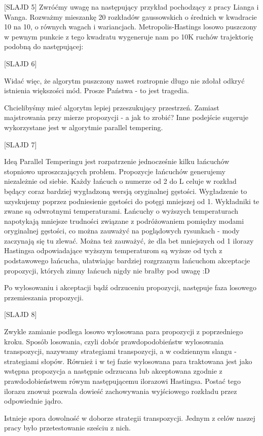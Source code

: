 [SLAJD 5] 
Zwróćmy uwagę na następujący przykład pochodzący z pracy Lianga i Wanga. Rozważmy mieszankę 20 rozkładów gaussowskich o średnich w kwadracie 10 na 10, o równych wagach i wariancjach. Metropolis-Hastings losowo puszczony w pewnym punkcie z tego kwadratu wygeneruje nam po 10K ruchów trajektorię podobną do następującej:

[SLAJD 6]

Widać więc, że algorytm puszczony nawet roztropnie długo nie zdołał odkryć istnienia większości mód. Prosze Państwa - to jest tragedia.

Chcielibyśmy mieć algorytm lepiej przeszukujący przestrzeń. Zamiast majstrowania przy mierze propozycji - a jak to zrobić? Inne podejście sugeruje  wykorzystane jest w algorytmie parallel tempering. 

[SLAJD 7]

Ideą Parallel Temperingu jest rozpatrzenie jednocześnie kilku łańcuchów stopniowo uproszczających problem. Propozycje łańcuchów generujemy niezależnie od siebie. Każdy łańcuch o numerze od 2 do L celuje w rozkład będący coraz bardziej wygładzoną wersją oryginalnej gęstości. Wygładzenie to uzyskujemy poprzez podniesienie gęstości do potęgi mniejszej od 1. Wykładniki te zwane są odwrotnymi temperaturami. Łańcuchy o wyższych temperaturach napotykają mniejsze trudności związane z podróżowaniem pomiędzy modami oryginalnej gęstości, co można zauważyć na poglądowych rysunkach - mody zaczynają się tu zlewać. Można też zauważyć, że dla bet mniejszych od 1 ilorazy Hastingsa odpowiadające wyższym temperaturom są wyższe od tych z podstawowego łańcucha, ułatwiając bardziej rozgrzanym łańcuchom akceptacje propozycji, których zimny łańcuch nigdy nie brałby pod uwagę :D

Po wylosowaniu i akceptacji bądź odrzuceniu propozycji, następuje faza losowego przemieszania propozycji.

[SLAJD 8]

Zwykle zamianie podlega losowo wylosowana para propozycji z poprzedniego kroku. Sposób losowania, czyli dobór prawdopodobieństw wylosowania transpozycji, nazywamy strategiami transpozycji, a w codziennym slangu - strategiami słopów. Również i w tej fazie wylosowana para traktowana jest jako wstępna propozycja a następnie odrzucana lub akceptowana zgodnie z prawdodobieństwem rówym następującemu ilorazowi Hastingsa. Postać tego ilorazu znowuż pozwala dowieść zachowywania wyjściowego rozkładu przez odpowiednie jądro.

Istnieje spora dowolność w doborze strategii transpozycji. Jednym z celów naszej pracy było przetestowanie sześciu z nich.

